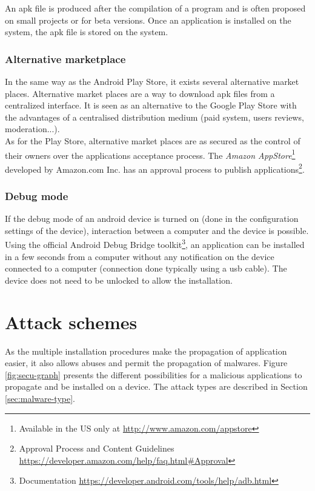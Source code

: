 An apk file is produced after the compilation of a program and is often proposed on small projects or for beta versions.
Once an application is installed on the system, the apk file is stored on the system.

\subsubsection{Alternative marketplace}
In the same way as the Android Play Store, it exists several alternative market places.
Alternative market places are a way to download apk files from a centralized interface.
It is seen as an alternative to the Google Play Store with the advantages of a centralised distribution medium (paid system, users reviews, moderation...).\\

As for the Play Store, alternative market places are as secured as the control of their owners over the applications acceptance process.
The \emph{Amazon AppStore}\footnote{Available in the US only at \url{http://www.amazon.com/appstore}} developed by Amazon.com Inc. has an approval process to publish applications\footnote{Approval Process and Content Guidelines \url{https://developer.amazon.com/help/faq.html#Approval}}.

\subsubsection{Debug mode}
If the debug mode of an android device is turned on (done in the configuration settings of the device), interaction between a computer and the device is possible.
Using the official Android Debug Bridge toolkit\footnote{Documentation \url{https://developer.android.com/tools/help/adb.html}}, an application can be installed in a few seconds from a computer without any notification on the device connected to a computer (connection done typically using a usb cable).
The device does not need to be unlocked to allow the installation.

\section{Attack schemes}

As the multiple installation procedures make the propagation of application easier, it also allows abuses and permit the propagation of malwares.
Figure \ref{fig:secu-graph} presents the different possibilities for a malicious applications to propagate and be installed on a device.
The attack types are described in Section \ref{sec:malware-type}.

